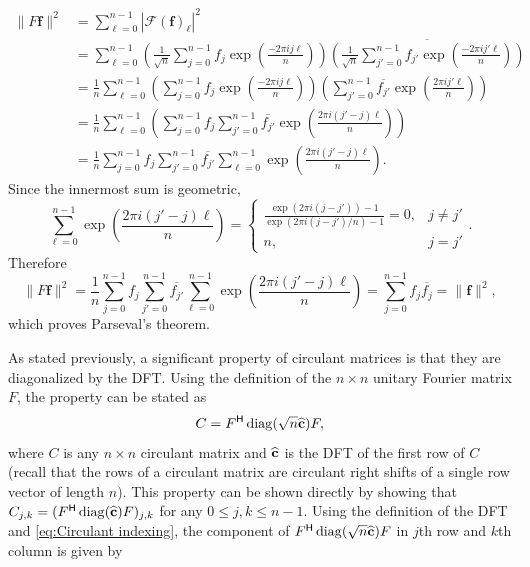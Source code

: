 \begin{align*}
\|F\mathbf{f}\|^2 &= \sum_{\ell=0}^{n-1} |\mathcal{F}(\mathbf{f})_\ell |^2 \\
&= \sum_{\ell=0}^{n-1} \left(\frac{1}{\sqrt{n}}\sum_{j=0}^{n-1} f_{j}\exp\left(\frac{-2\pi{ij\ell}}{n}\right)\right)\overline{\left(\frac{1}{\sqrt{n}}\sum_{j'=0}^{n-1} f_{j'}\exp\left(\frac{-2\pi{ij'\ell}}{n}\right)\right)} \\
&= \frac{1}{n} \sum_{\ell=0}^{n-1} \left(\sum_{j=0}^{n-1} f_{j}\exp\left(\frac{-2\pi{ij\ell}}{n}\right)\right) \left(\sum_{j'=0}^{n-1} \overline{f_{j'}}\exp\left(\frac{2\pi{ij'\ell}}{n}\right)\right) \\
&= \frac{1}{n} \sum_{\ell=0}^{n-1} \left(\sum_{j=0}^{n-1} f_{j} \sum_{j'=0}^{n-1} \overline{f_{j'}} \exp\left(\frac{2\pi{i(j'-j)\ell}}{n}\right)\right) \\
&= \frac{1}{n} \sum_{j=0}^{n-1} f_j \sum_{j'=0}^{n-1} \overline{f_{j'}} \sum_{\ell=0}^{n-1} \exp\left(\frac{2\pi{i(j'-j)\ell}}{n}\right).
\end{align*}
Since the innermost sum is geometric,
\[\sum_{\ell=0}^{n-1} \exp\left(\frac{2\pi{i(j'-j)\ell}}{n}\right) = \begin{cases}
\frac{\exp(2\pi{i}(j-j')) - 1}{\exp(2\pi{i}(j-j')/n) - 1} = 0, & j \neq j' \\
n, & j = j'
\end{cases}.\]
Therefore
\[\|F\mathbf{f}\|^2 = \frac{1}{n} \sum_{j=0}^{n-1} f_j \sum_{j'=0}^{n-1} \overline{f_{j'}} \sum_{\ell=0}^{n-1} \exp\left(\frac{2\pi{i(j'-j)\ell}}{n}\right) = \sum_{j=0}^{n-1} f_j\overline{f_j} = \|\mathbf{f}\|^2,\]
which proves Parseval's theorem. \par
As stated previously, a significant property of circulant matrices is that they are diagonalized by the DFT. Using the definition of the $n \times n$ unitary Fourier matrix $F$, the property can be stated as
\begin{equation}
C = {F}^\mathsf{H}\operatorname{diag}(\sqrt{n}\widehat{\mathbf{c}})F,
\label{eq:CircDiag}
\end{equation}
where $C$ is any $n \times n$ circulant matrix and $\widehat{\mathbf{c}}$ is the DFT of the first row of $C$ (recall that the rows of a circulant matrix are circulant right shifts of a single row vector of length $n$). This property can be shown directly by showing that $C_{j,k} = ({F}^\mathsf{H}\operatorname{diag}(\widehat{\mathbf{c}})F)_{j,k}$ for any $0 \leq j,k \leq n-1$. Using the definition of the DFT and \eqref{eq:Circulant indexing}, the component of ${F}^\mathsf{H}\operatorname{diag}(\sqrt{n}\widehat{\mathbf{c}})F$ in $j$th row and $k$th column is given by
